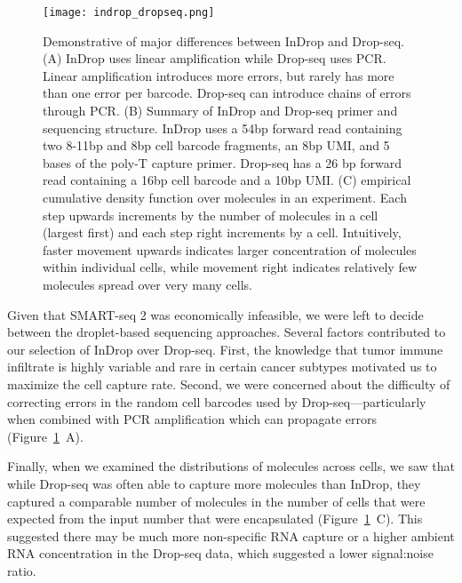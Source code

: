 \begin{figure}
\centering
\texttt{[image: indrop\_dropseq.png]}
\caption{Demonstrative of major differences between InDrop and Drop-seq. (A) InDrop uses linear amplification while Drop-seq uses PCR\@. Linear amplification introduces more errors, but rarely has more than one error per barcode. Drop-seq can introduce chains of errors through PCR\@. (B) Summary of InDrop and Drop-seq primer and sequencing structure. InDrop uses a 54bp forward read containing two 8-11bp and 8bp cell barcode fragments, an 8bp UMI, and 5 bases of the poly-T capture primer. Drop-seq has a 26 bp forward read containing a 16bp cell barcode and a 10bp UMI\@. (C) empirical cumulative density function over molecules in an experiment. Each step upwards increments by the number of molecules in a cell (largest first) and each step right increments by a cell. Intuitively, faster movement upwards indicates larger concentration of molecules within individual cells, while movement right indicates relatively few molecules spread over very many cells.}
\label{fig:indrop-dropseq}
\end{figure} 

Given that SMART-seq 2 was economically infeasible, we were left to decide between the droplet-based sequencing approaches.  
Several factors contributed to our selection of InDrop over Drop-seq. 
First, the knowledge that tumor immune infiltrate is highly variable and rare in certain cancer subtypes motivated us to maximize the cell capture rate.
Second, we were concerned about the difficulty of correcting errors in the random cell barcodes used by Drop-seq---particularly when combined with PCR amplification which can propagate errors (Figure~\ref{fig:indrop-dropseq}~A). 

Finally, when we examined the distributions of molecules across cells, we saw that while Drop-seq was often able to capture more molecules than InDrop, they captured a comparable number of molecules in the number of cells that were expected from the input number that were encapsulated (Figure~\ref{fig:indrop-dropseq}~C). 
This suggested there may be much more non-specific RNA capture or a higher ambient RNA concentration in the Drop-seq data, which suggested a lower signal:noise ratio. 

